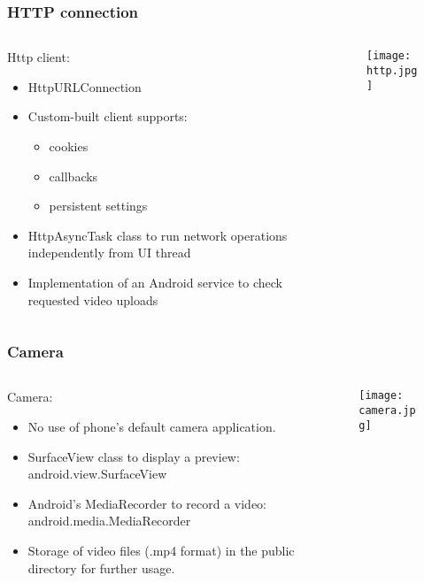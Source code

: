 \begin{frame}	
	\frametitle{HTTP connection}
	\begin{columns}[t]
		\begin{column}[t]{0.5\linewidth}
			Http client:
			\begin{itemize}
				\item HttpURLConnection
				\item Custom-built client supports:
				\begin{itemize}
					\item cookies
					\item callbacks
					\item persistent settings					
				\end{itemize} 
				\item HttpAsyncTask class to run network operations independently from UI thread
				\item Implementation of an Android service to check requested video uploads
			\end{itemize}
		\end{column}
		\begin{column}[t]{0.5\linewidth}
			\begin{figure}[!t]
				\centering
				\texttt{[image: http.jpg]}
				\label{fig:gen_arch}
			\end{figure}
			
		\end{column}		
	\end{columns}	
\end{frame}

\begin{frame}	
	\frametitle{Camera}
	\begin{columns}[t]
		\begin{column}[t]{0.5\linewidth}
			Camera:
			\begin{itemize}
				\item No use of phone's default camera application.
				\item SurfaceView class to display a preview: android.view.SurfaceView
				\item Android's MediaRecorder to record a video: android.media.MediaRecorder
				\item Storage of video files (.mp4 format) in the public directory for further usage. 
			\end{itemize}
		\end{column}
		\begin{column}[t]{0.5\linewidth}
			\begin{figure}[!t]
				\centering
				\texttt{[image: camera.jpg]}
				\label{fig:gen_arch}
			\end{figure}
			
		\end{column}		
	\end{columns}	
\end{frame}


